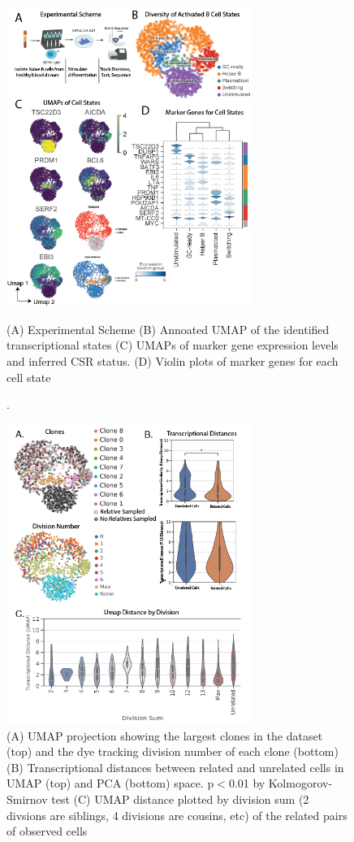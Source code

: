 \begin{figure}[hbt!]
\centering
\includegraphics[width=8cm, keepaspectratio]{figs/prelim_paper2/BCellLineagePaper_Figure 1.png}
\caption[Experimental overview and transcriptional data for Naive B cell activation].{(A) Experimental Scheme (B) Annoated UMAP of the identified transcriptional states (C) UMAPs of marker gene expression levels and inferred CSR status. (D) Violin plots of marker genes for each cell state}
\label{fig:paper2_prelimfig_1}
\end{figure}

\begin{figure}[htb!]
\centering
\includegraphics[width=8cm, keepaspectratio]{figs/prelim_paper2/BCellLineagePaper_Figure 2.png}
\caption[Transcriptomic similarity of clones \textit{in vitro}]{(A) UMAP projection showing the largest clones in the dataset (top) and the dye tracking division number of each clone (bottom) (B) Transcriptional distances between related and unrelated cells in UMAP (top) and PCA (bottom) space. p$<$0.01 by Kolmogorov-Smirnov test (C) UMAP distance plotted by division sum (2 divsions are siblings, 4 divisions are cousins, etc) of the related pairs of observed cells}
\label{fig:paper2_prelimfig_2}
\end{figure}

